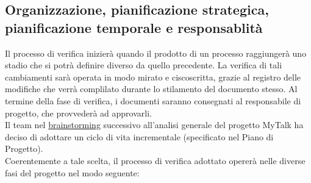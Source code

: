\subsection{Organizzazione, pianificazione strategica, pianificazione temporale e responsablità}
Il processo di verifica inizierà quando il prodotto di un processo raggiungerà uno stadio che si potrà definire diverso da quello precedente. La verifica di tali cambiamenti sarà operata in modo mirato e ciscoscritta, grazie al registro delle modifiche che verrà complilato durante lo stilamento del documento stesso. Al termine della fase di verifica, i documenti saranno consegnati al responsabile di progetto, che provvederà ad approvarli.\\
Il team nel \underline{brainstorming} successivo all'analisi generale del progetto MyTalk ha deciso di adottare un ciclo di vita incrementale (specificato nel Piano di Progetto).\\
Coerentemente a tale scelta, il processo di verifica adottato opererà nelle diverse fasi del progetto nel modo seguente: \\
